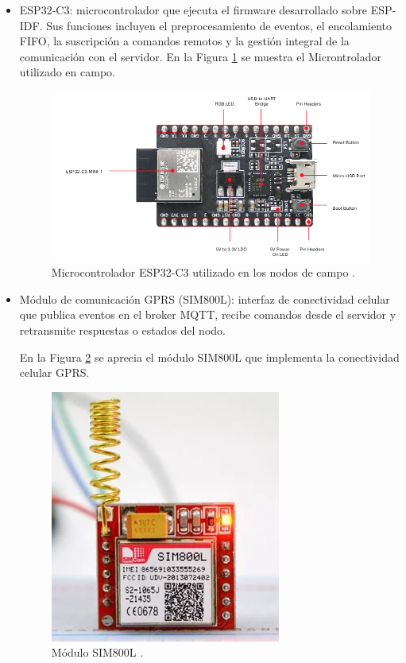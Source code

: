 \begin{itemize}
     
    
    \item ESP32-C3: microcontrolador que ejecuta el firmware desarrollado sobre ESP-IDF. Sus funciones incluyen el preprocesamiento de eventos, el encolamiento FIFO, la suscripción a comandos remotos y la gestión integral de la comunicación con el servidor.
   En la Figura \ref{fig:esp32} se muestra el Microntrolador utilizado en campo.

\begin{figure}[htbp]
  \centering
  \includegraphics[width=0.85\linewidth]{./Figures/fotoEsp32c3.png}
  \caption{Microcontrolador ESP32-C3 utilizado en los nodos de campo \protect\footnotemark.}
  \label{fig:esp32}
\end{figure}


    
    \item Módulo de comunicación GPRS (SIM800L): interfaz de conectividad celular que publica eventos en el broker MQTT, recibe comandos desde el servidor y retransmite respuestas o estados del nodo.
    
En la Figura \ref{fig:foto_sim800l} se aprecia el módulo SIM800L que implementa la conectividad celular GPRS.

\begin{figure}[htbp]
  \centering
  \includegraphics[width=0.4\linewidth]{./Figures/fotoSim800l.png}
  \caption{Módulo SIM800L \protect\footnotemark.}
  \label{fig:foto_sim800l}
\end{figure}



\end{itemize}



